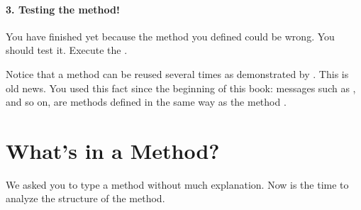 {{%
\paragraph{3. Testing the method!} You \newcommand{\remove}[1]{do not} have \newcommand{\add}[1]{not} finished yet\newcommand{\add}[1]{,} because 
the method you \newcommand{\replace}[2]{type}{defined} \newcommand{\replace}[2]{may}{could} be wrong\newcommand{\replace}[2]{ so you}{. You} should test it.  Execute the
\newcommand{\add}[1]{ by sending a message with the new method's name \ct{square} to a robot}.

\newcommand{\replace}[2]{At this point you should realize}{Notice} that a method can be reused several times\newcommand{\add}[1]{,} as demonstrated by .  \newcommand{\replace}[2]{Note that this fact this}{This} is \newcommand{\replace}[2]{not new}{old news}. 
You \newcommand{\add}[1]{have} used \newcommand{\replace}[2]{that}{this fact} since the beginning of this book: messages such as \go, \turnLeft and so on, are \newcommand{\replace}[2]{implemented as methods, just like}{methods defined in the same way as} the method . 

\section{What's in a Method?}
We asked you to type a method without much explanation. Now is the time to
analyze the structure of the method. \newcommand{\add}[1]{\paragraph
''
A method is composed of a \emph{name}, an optional \emph{method comment} and a \emph{method body} (a sequence of messages) as shown by Figure~\ref{fig:methodskeleton}. \newcommand{\replace}[2]{To be exact, the}{The} method name can also contain parameters (\newcommand{\replace}[2]{See}{see}
chapter~\ref{ch:argumenting}), and the method body can \newcommand{\remove}[1]{contain} also
\newcommand{\replace}[2]{definition of}{define} local variables using vertical bars \ct{|} and \ct{|}.
\begin{figure}
\centerline{\texttt{[image: tbSixAnnotated]}} 
\caption{A method is composed of a name, a method comment and a 
method body. \label{fig:methodskeleton}}
\end{figure}

}}}
